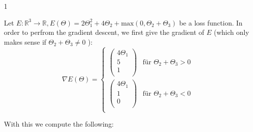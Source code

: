 \documentclass{article}
\begin{document}
\begin{ukon-infie}[12.11.17]{1}
		\begin{exercise}[p=10]{}
        	
		\end{exercise}
		
		\begin{exercise}[p=10]{}
        	
		\end{exercise}
		
		\begin{exercise}[p=10]{}
        	Let $E: \mathbb{R}^3 \rightarrow \mathbb{R}, E(\Theta) = 2\Theta_1^2 + 4\Theta_2 + \text{max}(0, \Theta_2 + \Theta_3)$ be a loss function. In order to perfrom the gradient descent, we first give the gradient of $E$ (which only makes sense if $\Theta_2 + \Theta_3 \not = 0$ ): 
\begin{equation}
\nabla E(\Theta) =
\begin{cases}
\left(
\begin{array}{c}
4 \Theta_1\\
5\\
1\\
\end{array}
\right) & \text{für } \Theta_2 + \Theta_3 > 0 \\
 \left(
\begin{array}{c}
4\Theta_1\\
1\\
0\\
\end{array}
\right) & \text{für } \Theta_2 + \Theta_3 < 0\\
\end{cases}
\end{equation}

With this we compute the following:\\


\end{exercise}
\end{ukon-infie}
\end{document}

